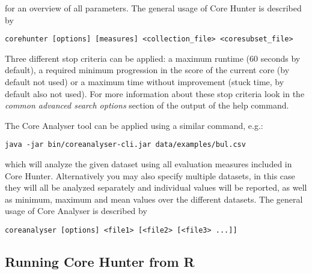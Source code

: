 \documentclass[a4paper, titlepage, 11pt]{article}
\begin{document}
for an overview of all parameters. The general usage of Core Hunter is described by
\small
\begin{verbatim}
corehunter [options] [measures] <collection_file> <coresubset_file>
\end{verbatim}
\normalsize

Three different stop criteria can be applied: a maximum runtime (60 seconds by default), a required minimum progression in the score of the current core (by default not used) or a maximum time without improvement (stuck time, by default also not used). For more information about these stop criteria look in the \emph{common advanced search options} section of the output of the help command.

The Core Analyser tool can be applied using a similar command, e.g.:
\small
\begin{verbatim}
java -jar bin/coreanalyser-cli.jar data/examples/bul.csv
\end{verbatim}
\normalsize
which will analyze the given dataset using all evaluation measures included in Core Hunter. Alternatively you may also specify multiple datasets, in this case they will all be analyzed separately and individual values will be reported, as well as minimum, maximum and mean values over the different datasets. The general usage of Core Analyser is described by
\small
\begin{verbatim}
coreanalyser [options] <file1> [<file2> [<file3> ...]]
\end{verbatim}
\normalsize

\subsection{Running Core Hunter from R}
\end{document}
